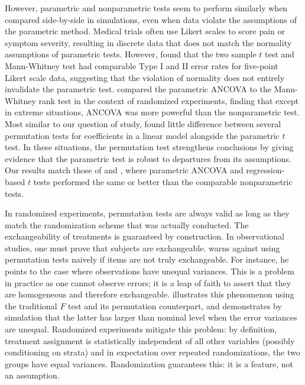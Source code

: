 \documentclass[12pt]{article}
\begin{document}
However, parametric and nonparametric tests seem to perform similarly when compared side-by-side in simulations, even when data violate the assumptions of the parametric method.
Medical trials often use Likert scales to score pain or symptom severity, resulting in discrete data that does not match the normality assumptions of parametric tests.
However, \cite{winter_five-point_2010} found that the two sample $t$ test and Mann-Whitney test had comparable Type I and II error rates for five-point Likert scale data, suggesting that the violation of normality does not entirely invalidate the parametric test.
\cite{vickers_parametric_2005} compared the parametric ANCOVA to the Mann-Whitney rank test in the context of randomized experiments, finding that except in extreme situations, ANCOVA was more powerful than the nonparametric test.
Most similar to our question of study, \cite{anderson_empirical_1999} found little difference between several permutation tests for coefficients in a linear model alongside the parametric $t$ test.
In these situations, the permutation test strengthens conclusions by giving evidence that the parametric test is robust to departures from its assumptions.
Our results match those of \citet{vickers_parametric_2005} and \citet{anderson_empirical_1999}, where parametric ANCOVA and regression-based $t$ tests performed the same or better than the comparable nonparametric tests.

In randomized experiments, permutation tests are always valid as long as they match the randomization scheme that was actually conducted.
The exchangeability of treatments is guaranteed by construction.
In observational studies, one must prove that subjects are exchangeable.
\cite{romano_behavior_1990} warns against using permutation tests naively if items are not truly exchangeable. 
For instance, he points to the case where observations have unequal variances.  
This is a problem in practice as one cannot observe errors; it is a leap of faith to assert that they are homogeneous and therefore exchangeable.
\cite{boik_fisherpitman_1987} illustrates this phenomenon using the traditional $F$ test and its permutation counterpart, 
and demonstrates by simulation that the latter has larger than nominal level when the error variances are unequal.
Randomized experiments mitigate this problem: 
by definition, treatment assignment is statistically independent of all other variables (possibly conditioning on strata) and in expectation over repeated randomizations, the two groups have equal variances.
Randomization guarantees this: it is a feature, not an assumption.
\end{document}
